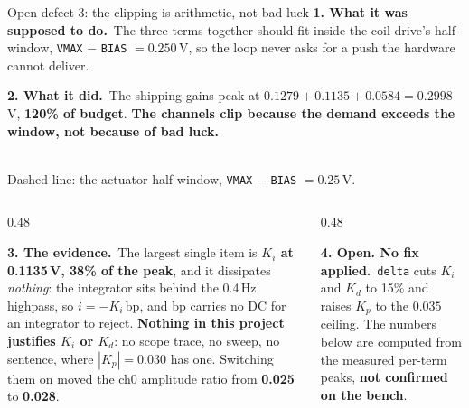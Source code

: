 \documentclass[aspectratio=169]{beamer}
\newcommand{\intended}{\textbf{1. What it was supposed to do.}}
\newcommand{\actual}{\textbf{2. What it did.}}
\newcommand{\evidence}{\textbf{3. The evidence.}}
\newcommand{\stillopen}{\textbf{4. Open. No fix applied.}}
\begin{document}
\begin{frame}{Open defect 3: the clipping is arithmetic, not bad luck}
  \footnotesize
  \intended\ The three terms together should fit inside the coil drive's
  half-window, \texttt{VMAX} $-$ \texttt{BIAS} $= 0.250$\,V, so the loop never
  asks for a push the hardware cannot deliver.

  \vspace{1mm}
  \actual\ The shipping gains peak at $0.1279 + 0.1135 + 0.0584 =
  \mathbf{0.2998}$\,V, \alert{\textbf{120\% of budget}}. \textbf{The channels
  clip because the demand exceeds the window, not because of bad luck.}

  \vspace{1.5mm}
  \centering
  \\
  {\scriptsize Dashed line: the actuator half-window,
  \texttt{VMAX} $-$ \texttt{BIAS} $= 0.25$\,V.}

  \vspace{1mm}
  \begin{columns}[T]
    \begin{column}{0.48\textwidth}
      \raggedright
      \evidence\ The largest single item is \textbf{$K_i$ at 0.1135\,V, 38\% of
      the peak}, and it dissipates \emph{nothing}: the integrator sits behind the
      0.4\,Hz highpass, so $i = -K_i\,\mathrm{bp}$, and bp carries no DC for an
      integrator to reject. \textbf{Nothing in this project justifies $K_i$ or
      $K_d$}: no scope trace, no sweep, no sentence, where $|K_p| = 0.030$ has
      one. Switching them on moved the ch0 amplitude ratio from \textbf{0.025} to
      \textbf{0.028}.
    \end{column}
    \begin{column}{0.48\textwidth}
      \raggedright
      \stillopen\ \texttt{delta} cuts $K_i$ and $K_d$ to 15\% and raises $K_p$ to
      the $0.035$ ceiling. The numbers below are computed from the measured
      per-term peaks, \textbf{not confirmed on the bench}.


\end{column}
\end{columns}
\end{frame}
\end{document}

